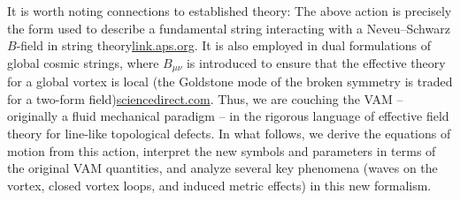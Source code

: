 \documentclass[12pt]{article}
\begin{document}
It is worth noting connections to established theory: The above action is precisely the form used to describe a fundamental string interacting with a Neveu–Schwarz $B$-field in string theory\href{https://link.aps.org/doi/10.1103/PhysRevD.9.2273#:~:text=Classical%20direct%20interstring%20action,2273}{link.aps.org}. It is also employed in dual formulations of global cosmic strings, where $B_{\mu\nu}$ is introduced to ensure that the effective theory for a global vortex is local (the Goldstone mode of the broken symmetry is traded for a two-form field)\href{https://www.sciencedirect.com/science/article/abs/pii/0370269373905935#:~:text=Construction%20of%20Pomeron%20states%20in,View%20full}{sciencedirect.com}. Thus, we are couching the VAM – originally a fluid mechanical paradigm – in the rigorous language of effective field theory for line-like topological defects. In what follows, we derive the equations of motion from this action, interpret the new symbols and parameters in terms of the original VAM quantities, and analyze several key phenomena (waves on the vortex, closed vortex loops, and induced metric effects) in this new formalism.
\end{document}
